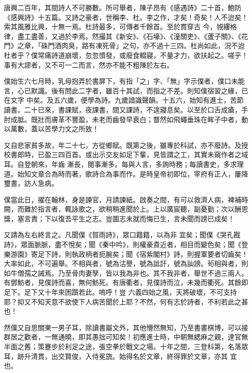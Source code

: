\begin{pinyinscope}
 唐興二百年，其間詩人不可勝數。所可舉者，陳子昂有《感遇詩》二十首，鮑防《感興詩》十五篇。又詩之豪者，世稱李、杜。李之作，才矣！奇矣！人不迨矣！索其風雅比興，十無一焉。杜詩最多，可傳者千餘首。至於貫穿古
 今，覙縷格律，盡工盡善，又過於李焉。然撮其《新安》、《石壕》、《潼關吏》、《蘆子關》、《花門》之章，「硃門酒肉臭，路有凍死骨」之句，亦不過十三四。杜尚如此，況不迨杜者乎？僕常痛詩道崩壞，忽忽憤發，或廢食輟寢，不量才力，欲扶起之。嗟乎！事有大謬者，又不可一二而言，然亦不能不粗陳於左右。



 僕始生六七月時，乳母抱弄於書屏下，有指「之」字、「無」字示僕者，僕口未能言，心已默識。後有問此二字者，雖百十其試，而指之不差。則知僕宿習之緣，已在文字
 中矣。及五六歲，便學為詩。九歲諳識聲韻。十五六，始知有進士，苦節讀書。二十已來，書課賦，夜課書，間又課詩，不遑寢息矣。以至於口舌成瘡，手肘成胝。既壯而膚革不豐盈，未老而齒發早衰白；瞀然如飛蠅垂珠在眸子中者，動以萬數，蓋以苦學力文之所致！



 又自悲家貧多故，年二十七，方從鄉賦。既第之後，雖專於科試，亦不廢詩。及授校書郎時，已盈三四百首。或出示交友如足下輩，見皆謂之工，其實未窺作者之域耳。自登朝來，年齒
 漸長，閱事漸多。每與人言，多詢時務；每讀書史，多求理道。始知文章合為時而著，歌詩合為事而作。是時皇帝初即位，宰府有正人，屢降璽書，訪人急病。



 僕當此日，擢在翰林，身是諫官，月請諫紙。啟奏之間，有可以救濟人病，裨補時闕，而難於指言者，輒詠歌之，欲稍稍進聞於上。上以廣宸聽，副憂勤；次以酬恩獎，塞言責；下以復吾平生之志。豈圖志未就而悔已生，言未聞而謗已成矣！



 又請為左右終言之。凡聞僕《賀雨詩》，眾口籍籍，以為非
 宜矣；聞僕《哭孔戡詩》，眾面脈脈，盡不悅矣；聞《秦中吟》，則權豪貴近者，相目而變色矣；聞《登樂游園》寄足下詩，則執政柄者扼腕矣；聞《宿紫閣村》詩，則握軍要者切齒矣！大率如此，不可遍舉。不相與者，號為沽譽，號為詆訐，號為訕謗。茍相與者，則如牛僧孺之誡焉。乃至骨肉妻孥，皆以我為非也。其不我非者，舉世不過三兩人。有鄧魴者，見僕詩而喜，無何魴死。有唐衢者，見僕詩而泣，未幾而衢死。其餘即足下。足下又十年來困躓若此。嗚呼！豈
 六義四始之風，天將破壞，不可支持耶？抑又不知天意不欲使下人病苦聞於上耶？不然，何有志於詩者，不利若此之甚也！



 然僕又自思關東一男子耳，除讀書屬文外，其他懵然無知，乃至書畫棋博，可以接群居之歡者，一無通曉，即其愚拙可知矣！初應進士時，中朝無緦麻之親，達官無半面之舊；策蹇步於利足之途，張空拳於戰文之場。十年之間，三登科第，名落眾耳，跡升清貫，出交賢俊，入侍冕旒。始得名於文章，終得罪於文章，亦其
 宜也。




\end{pinyinscope}
